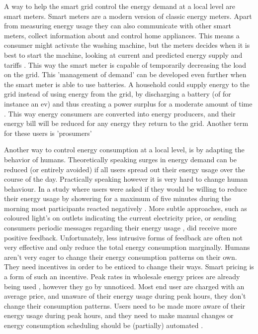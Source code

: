 A way to help the smart grid control the energy demand at a local level are smart meters. Smart meters are a modern version of classic energy meters. Apart from measuring energy usage they can also communicate with other smart meters, collect information about and control home appliances. This means a consumer might activate the washing machine, but the meters decides when it is best to start the machine, looking at current and predicted energy supply and tariffs  \cite{DepuruWangDevabhaktuni2011a}. This way the smart meter is capable of temporarily decreasing the load on the grid. This 'management of demand' can be developed even further when the smart meter is able to use batteries. A household could supply energy to the grid instead of using energy from the grid, by discharging a battery (of for instance an \gls{ev}) and thus creating a power surplus for a moderate amount of time \cite{MwasiluJustoKimEtAl2014}. This way energy consumers are converted into energy producers, and their energy bill will be reduced for any energy they return to the grid. Another term for these users is 'prosumers'

Another way to control energy consumption at a local level, is by adapting the behavior of humans. Theoretically speaking surges in energy demand can be reduced (or entirely avoided) if all users spread out their energy usage over the course of the day. Practically speaking however it is very hard to change human behaviour. In a study where users were asked if they would be willing to reduce their energy usage by showering for a maximum of five minutes during the morning most participants reacted negatively \cite{GouldenBedwellRennick-EgglestoneEtAl2014}. More subtle approaches, such as coloured light's on outlets indicating the current electricity price, or sending consumers periodic messages regarding their energy usage \cite{AyresRasemanShih2012}, did receive more positive feedback. Unfortunately, less intrusive forms of feedback are often not very effective and only reduce the total energy consumption marginally. Humans aren’t very eager to change their energy consumption patterns on their own. They need incentives in order to be enticed to change their ways. Smart pricing is a form of such an incentive. Peak rates in wholesale energy prices are already being used \cite{SamadiMohsenian-RadSchoberEtAl2012}, however they go by unnoticed. Most end user are charged with an average price, and unaware of their energy usage during peak hours, they don’t change their consumption patterns. Users need to be made more aware of their energy usage during peak hours, and they need to make manual changes \cite{Mohsenian-RadLeon-Garcia2010} or energy consumption scheduling should be (partially) automated \cite{SamadiMohsenian-RadSchoberEtAl2012}.

